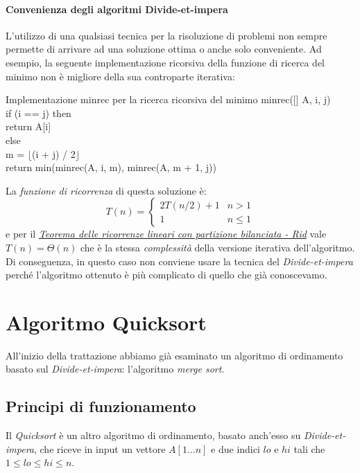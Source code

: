 \paragraph{Convenienza degli algoritmi Divide-et-impera}
L'utilizzo di una qualsiasi tecnica per la risoluzione di problemi non sempre
permette di arrivare ad una soluzione ottima o anche solo conveniente.
Ad esempio, la seguente implementazione ricorsiva della funzione di ricerca del
minimo non è migliore della sua controparte iterativa:
\begin{minicode}{Implementazione minrec per la ricerca ricorsiva del minimo}
    \ind{} minrec([] A,  i,  j)\\
        \indf if (i == j) then\\
            return A[i]\\
        \indf else\\
            m = $\lfloor$(i + j) / 2$\rfloor$\\
            return min(minrec(A, i, m), minrec(A, m + 1, j))
\end{minicode}\noindent
La \emph{funzione di ricorrenza} di questa soluzione è:
\[T(n)=\begin{cases}
    2T(n/2)+1 & n>1\\
    1 & n\leq1
\end{cases}\]
e per il \emph{\hyperref[def:19]{Teorema delle ricorrenze lineari con
partizione bilanciata - Rid}} vale $T(n)=\Theta(n)$ che è la stessa
\emph{complessità} della versione iterativa dell'algoritmo. Di conseguenza,
in questo caso non conviene usare la tecnica del \emph{Divide-et-impera} perché
l'algoritmo ottenuto è più complicato di quello che già conoscevamo.

\section{Algoritmo Quicksort}
All'inizio della trattazione abbiamo già esaminato un algoritmo di ordinamento
basato sul \emph{Divide-et-impera}: l'algoritmo \emph{merge sort}.

\subsection{Principi di funzionamento}
Il \emph{Quicksort} è un altro algoritmo di ordinamento, basato anch'esso su
\emph{Divide-et-impera}, che riceve in input un vettore $A[1\dots n]$ e due indici $lo$ e
$hi$ tali che $1\leq lo\leq hi\leq n$.

